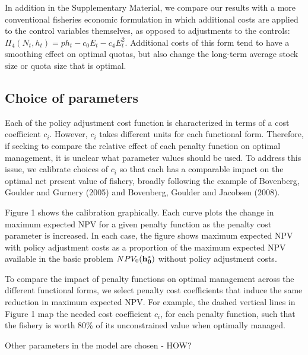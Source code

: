 \documentclass{article}\usepackage{graphicx, color}
\begin{document}
In addition in the Supplementary Material, we compare our results with a more conventional fisheries economic formulation in which additional costs are applied to the control variables themselves, as opposed to adjustments to the controls: $ \Pi_4 (N_t,h_t) = p h_t -  c_0 E_t-c_4E_t^2$. Additional costs of this form tend to have  a smoothing effect on optimal quotas, but also change the long-term average stock size or quota size that is optimal.

\subsection*{Choice of parameters}

Each of the policy adjustment cost function is characterized in terms
of a cost coefficient $c_i$.  However, $c_i$ takes different units for each  functional form. Therefore, if seeking to compare the relative effect of each penalty function on optimal management, it is unclear what parameter values should be used. To address this issue, we calibrate choices of $c_i$ so that each has a comparable impact on the optimal net present value of fishery, broadly following the example of Bovenberg, Goulder and Gurnery (2005) and Bovenberg, Goulder and Jacobsen (2008).

Figure 1 shows the calibration graphically.  Each curve plots the change in maximum expected NPV for a given penalty function as the penalty cost parameter is increased. In each case, the figure shows maximum expected NPV with policy adjustment costs as a proportion of the maximum expected NPV available in the basic problem $NPV_0({\bf h_0^*})$ without policy adjustment costs. 

To compare the impact of penalty functions on optimal management across the different functional forms, we select penalty cost coefficients that induce the same reduction in maximum expected NPV. For example, the dashed vertical lines in Figure 1 map the needed cost coefficient $c_i$, for each penalty function, such that the fishery is worth 80\% of its unconstrained value when optimally managed. 

Other parameters in the model are chosen - HOW? 
\end{document}
